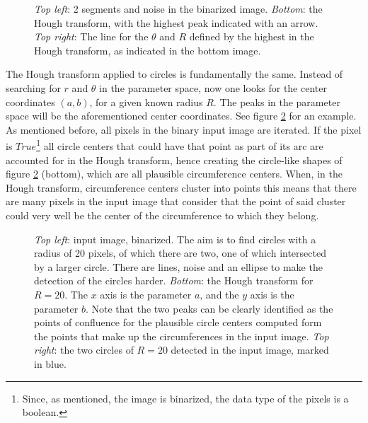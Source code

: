 \documentclass[../main.tex]{subfiles}
\begin{document}
\begin{figure}[htbp]
    \centering
    \caption{\emph{Top left}: 2 segments and noise in the binarized image. \emph{Bottom}: the Hough transform, with the highest peak indicated with an arrow. \emph{Top right}: The line for the $\theta$ and $R$ defined by the highest in the Hough transform, as indicated in the bottom image.}
    \label{fig:hough_demo_segments_noise}
\end{figure}

The Hough transform applied to circles is fundamentally the same. Instead of searching for $r$ and $\theta$ in the parameter space, now one looks for the center coordinates $\left(a, b\right)$, for a given known radius $R$. The peaks in the parameter space will be the aforementioned center coordinates. See figure \ref{fig:hough_demo_circles} for an example. As mentioned before, all pixels in the binary input image are iterated. If the pixel is $True$\footnote{Since, as mentioned, the image is binarized, the data type of the pixels is a boolean.} all circle centers that could have that point as part of its arc are accounted for in the Hough transform, hence creating the circle-like shapes of figure \ref{fig:hough_demo_circles} (bottom), which are all plausible circumference centers. When, in the Hough transform, circumference centers cluster into points this means that there are many pixels in the input image that consider that the point of said cluster could very well be the center of the circumference to which they belong.

\begin{figure}[htbp]
    \centering
    \caption{\emph{Top left}: input image, binarized. The aim is to find circles with a radius of 20 pixels, of which there are two, one of which intersected by a larger circle. There are lines, noise and an ellipse to make the detection of the circles harder. \emph{Bottom}: the Hough transform for $R=20$. The $x$ axis is the parameter $a$, and the $y$ axis is the parameter $b$. Note that the two peaks can be clearly identified as the points of confluence for the plausible circle centers computed form the points that make up the circumferences in the input image. \emph{Top right}: the two circles of $R=20$ detected in the input image, marked in blue.}
    \label{fig:hough_demo_circles}
\end{figure}
\end{document}
